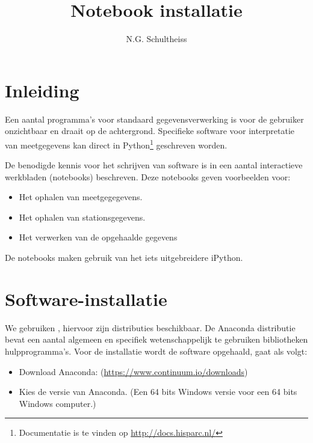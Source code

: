 

\title{Notebook installatie}
\author{N.G. Schultheiss}



\maketitle

\section{Inleiding}

Een aantal programma's voor standaard \hisparc gegevensverwerking is voor de gebruiker onzichtbaar
en draait op de achtergrond. Specifieke software voor interpretatie van meetgegevens kan direct in
Python\footnote{Documentatie is te vinden op \url{http://docs.hisparc.nl/}} geschreven worden.

De benodigde kennis voor het schrijven van \python software is in een aantal interactieve werkbladen
 (notebooks) beschreven. Deze notebooks geven voorbeelden voor:
\begin{itemize}
\item Het ophalen van meetgegegevens.
\item Het ophalen van stationsgegevens.
\item Het verwerken van de opgehaalde gegevens
\end{itemize}
De notebooks maken gebruik van het iets uitgebreidere iPython.

\section{Software-installatie}

We gebruiken , hiervoor zijn distributies beschikbaar. De  Anaconda distributie bevat een aantal algemeen en specifiek wetenschappelijk te gebruiken bibliotheken hulpprogramma's. Voor de installatie wordt de software opgehaald, gaat als volgt:

\begin{itemize}
\item Download Anaconda: (\url{https://www.continuum.io/downloads})
\item Kies de  versie van Anaconda. (Een 64 bits Windows versie voor een 64 bits Windows computer.)
\end{itemize}

